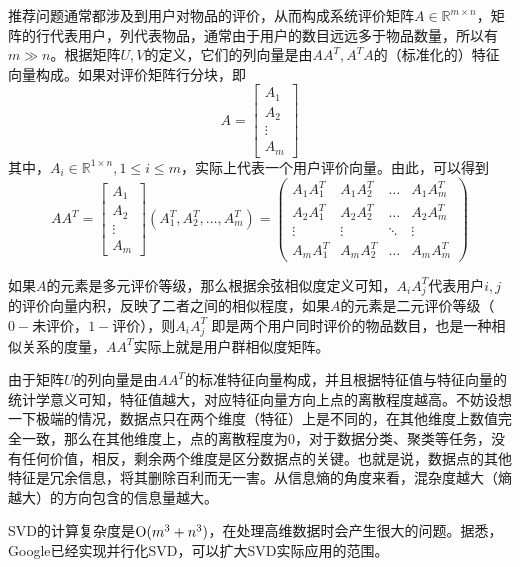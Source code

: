 推荐问题通常都涉及到用户对物品的评价，从而构成系统评价矩阵$A\in \mathbb R^{m\times n}$，矩阵的行代表用户，列代表物品，通常由于用户的数目远远多于物品数量，所以有$m \gg n$。根据矩阵$U,V$的定义，它们的列向量是由$AA^T,A^TA$的（标准化的）特征向量构成。如果对评价矩阵行分块，即
\begin{equation}
  A =
    \begin{bmatrix}
        A_1\\
        A_2\\
        \vdots\\
        A_m
    \end{bmatrix}
\end{equation}
其中，$A_i\in \mathbb R^{1\times n}, 1 \le i \le m$，实际上代表一个用户评价向量。由此，可以得到
\begin{equation}
  AA^T =
    \begin{bmatrix}
        A_1\\
        A_2\\
        \vdots\\
        A_m
    \end{bmatrix}
(A_1^T, A_2^T, \ldots, A_m^T)
=
    \begin{pmatrix}
        A_1A_1^T & A_1A_2^T & \ldots & A_1A_m^T\\
        A_2A_1^T & A_2A_2^T & \ldots & A_2A_m^T\\
        \vdots & \vdots & \ddots & \vdots\\
        A_mA_1^T & A_mA_2^T & \ldots & A_mA_m^T
    \end{pmatrix}
\end{equation}

如果$A$的元素是多元评价等级，那么根据余弦相似度定义可知，$A_iA_j^T$代表用户$i,j$的评价向量内积，反映了二者之间的相似程度，如果$A$的元素是二元评价等级（$0-$未评价，$1-$评价），则$A_iA_j^T$ 即是两个用户同时评价的物品数目，也是一种相似关系的度量，$AA^T$实际上就是用户群相似度矩阵。

由于矩阵$U$的列向量是由$AA^T$的标准特征向量构成，并且根据特征值与特征向量的统计学意义可知，特征值越大，对应特征向量方向上点的离散程度越高。不妨设想一下极端的情况，数据点只在两个维度（特征）上是不同的，在其他维度上数值完全一致，那么在其他维度上，点的离散程度为0，对于数据分类、聚类等任务，没有任何价值，相反，剩余两个维度是区分数据点的关键。也就是说，数据点的其他特征是冗余信息，将其删除百利而无一害。从信息熵的角度来看，混杂度越大（熵越大）的方向包含的信息量越大。

SVD的计算复杂度是$\operatorname{\mathrm{O}}(m^3 + n^3)$，在处理高维数据时会产生很大的问题。据悉，Google已经实现并行化SVD，可以扩大SVD实际应用的范围。

